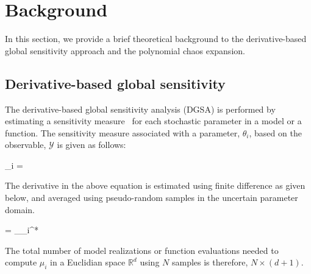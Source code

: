 \section{Background}
\label{sec:bg}

In this section, we provide a brief theoretical background to the
derivative-based global sensitivity approach and the polynomial chaos
expansion.

\subsection{Derivative-based global sensitivity}  

The derivative-based global sensitivity analysis (DGSA) is performed by 
estimating a sensitivity measure~\cite{Kucherenko:2009} for each stochastic
parameter in a model or a function. The
sensitivity measure associated with a parameter, $\theta_i$, based on
the observable, $\mathcal{Y}$ is given as follows:

\be
\mu_i = 
\label{eq:mu}
\ee

\noindent The derivative in the above equation is estimated using finite
difference as given below, and averaged using pseudo-random samples in
the uncertain parameter domain. 

\be
{} =
 \lim_{\Delta\theta_i^{*}}
\ee

\noindent The total number of model realizations or function evaluations
needed to
compute $\mu_i$ in a Euclidian space $\mathbb{R}^d$ using $N$ samples is
therefore, $N\times(d+1)$.

